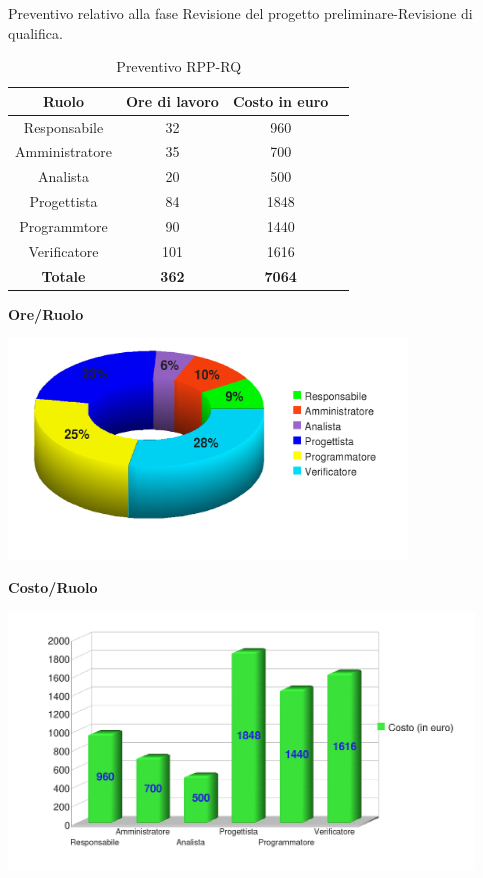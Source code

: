 Preventivo relativo alla fase Revisione del progetto preliminare-Revisione di qualifica.
\begin{table}[h]
	\begin{center}
		  \begin{tabular}{|c|c|c|c|}
		 \hline 
		 \textbf{Ruolo} & \textbf{Ore di lavoro} & \textbf{Costo in euro}\\
		 \hline
		Responsabile & 32 & 960 \\
		Amministratore & 35 & 700\\
		Analista & 20 & 500\\
		Progettista & 84 & 1848\\
		Programmtore & 90 & 1440 \\
		Verificatore & 101 & 1616\\
        \hline
        \textbf{Totale} & \textbf{362} & \textbf{7064}\\
		\hline
		\end{tabular}
	\caption{Preventivo RPP-RQ} 
	\label{tab:tabella_RPP-RQ}
	\end{center}	
\end{table}


\begin{center}\textbf{Ore/Ruolo}
\end{center}
\includegraphics[width=300pt]{RPP-RQ_Ore}
\newpage
\begin{center}\textbf{Costo/Ruolo}
\end{center}
\includegraphics[width=350pt]{RPP-RQ_Costi}

